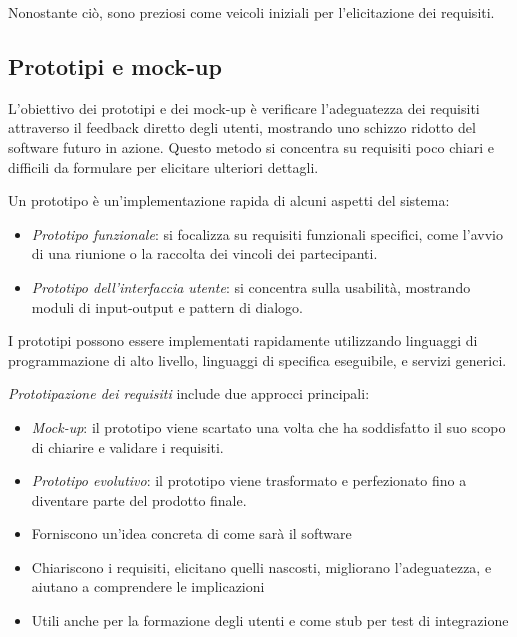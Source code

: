 Nonostante ciò, sono preziosi come veicoli iniziali per l'elicitazione dei
requisiti.

\subsection{Prototipi e mock-up}

L'obiettivo dei prototipi e dei mock-up è verificare l'adeguatezza dei requisiti
attraverso il feedback diretto degli utenti, mostrando uno schizzo ridotto del
software futuro in azione. Questo metodo si concentra su requisiti poco chiari
e difficili da formulare per elicitare ulteriori dettagli.

Un prototipo è un'implementazione rapida di alcuni aspetti del sistema:
\begin{itemize}
    \item \textit{Prototipo funzionale}: si focalizza su requisiti funzionali
    specifici, come l'avvio di una riunione o la raccolta dei vincoli dei
    partecipanti.
    \item \textit{Prototipo dell'interfaccia utente}: si concentra sulla
    usabilità, mostrando moduli di input-output e pattern di dialogo.
\end{itemize}

I prototipi possono essere implementati rapidamente utilizzando linguaggi
di programmazione di alto livello, linguaggi di specifica eseguibile, e
servizi generici.

\textit{Prototipazione dei requisiti} include due approcci principali:
\begin{itemize}
    \item \textit{Mock-up}: il prototipo viene scartato una volta che ha
    soddisfatto il suo scopo di chiarire e validare i requisiti.
    \item \textit{Prototipo evolutivo}: il prototipo viene trasformato
    e perfezionato fino a diventare parte del prodotto finale.
\end{itemize}

\begin{tcolorbox}[colback=green!5!white,colframe=green!75!black, title=Pro
    dei prototipi e mock-up]
    \begin{itemize}
        \item Forniscono un'idea concreta di come sarà il software
        \item Chiariscono i requisiti, elicitano quelli nascosti, migliorano
        l'adeguatezza, e aiutano a comprendere le implicazioni
        \item Utili anche per la formazione degli utenti e come stub per test
        di integrazione
    \end{itemize}
\end{tcolorbox}

